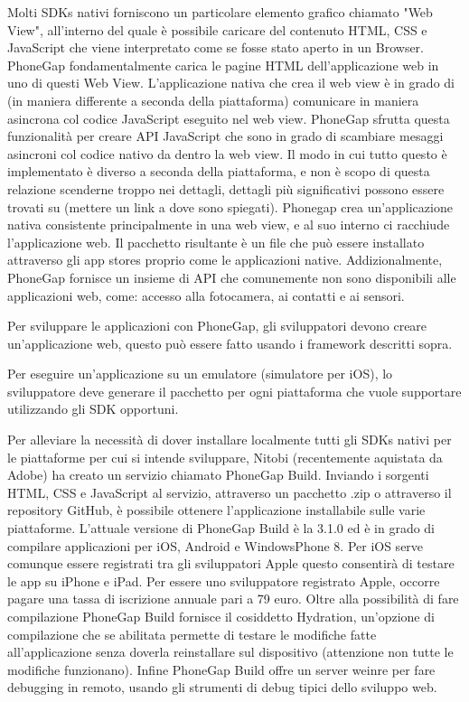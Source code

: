 			Molti SDKs nativi forniscono un particolare elemento grafico chiamato 
			"Web View", all'interno del quale è possibile caricare del contenuto 
			HTML, CSS e JavaScript che viene interpretato come se fosse stato aperto in 
			un Browser. 
			PhoneGap fondamentalmente carica le pagine HTML dell'applicazione web 
			in uno di questi Web View. L'applicazione nativa che crea il web view 
			è in grado di (in maniera differente a seconda della piattaforma) 
			comunicare in maniera asincrona col codice JavaScript eseguito nel 
			web view. 
			PhoneGap sfrutta questa funzionalità per creare API JavaScript 
			che sono in grado di scambiare mesaggi asincroni col codice 
			nativo da dentro la web view.  
			Il modo in cui tutto questo è implementato è diverso a seconda della 
			piattaforma, e non è scopo di questa relazione scenderne troppo nei 
			dettagli, dettagli più significativi possono essere trovati su 
			(mettere un link a dove sono spiegati).
			Phonegap crea un'applicazione nativa consistente principalmente in 
			una web view, e al suo interno ci racchiude l'applicazione web. Il pacchetto 
			risultante è un file che può essere installato attraverso gli app stores
			proprio come le applicazioni native.
			Addizionalmente, PhoneGap fornisce un insieme di API che comunemente non 
			sono disponibili alle applicazioni web, come: accesso alla fotocamera, 
			ai contatti e ai sensori.
			
			Per sviluppare le applicazioni con PhoneGap, gli sviluppatori devono 
			creare un'applicazione web, questo può essere fatto usando i framework 
			descritti sopra.  
			
			Per eseguire un'applicazione su un emulatore (simulatore per iOS), 
			lo sviluppatore deve generare il pacchetto per ogni piattaforma che 
			vuole supportare utilizzando gli SDK opportuni.
			
			Per alleviare la necessità di dover installare localmente 
			tutti gli SDKs nativi 
			per le piattaforme per cui si intende sviluppare, Nitobi (recentemente 
			aquistata da Adobe) ha creato un servizio chiamato PhoneGap Build. 
			Inviando i sorgenti HTML, CSS e JavaScript al servizio, attraverso un 
			pacchetto .zip o attraverso il repository GitHub, è possibile ottenere 
			l'applicazione installabile sulle varie piattaforme.
			L'attuale versione di PhoneGap Build è la 3.1.0 ed è in grado di compilare 
			applicazioni per iOS, Android e WindowsPhone 8. Per iOS serve comunque 
			essere registrati tra gli sviluppatori Apple questo consentirà di 
			testare le app su iPhone e iPad. Per essere uno sviluppatore 
			registrato Apple, occorre pagare una tassa di iscrizione annuale 
			pari a 79 euro.
			Oltre alla possibilità di fare compilazione PhoneGap Build fornisce 
			il cosiddetto Hydration, un'opzione di compilazione che se abilitata 
			permette di testare le modifiche fatte all'applicazione senza doverla 
			reinstallare sul dispositivo (attenzione non tutte le modifiche 
			funzionano). Infine PhoneGap Build offre un server weinre per fare 
			debugging in remoto, usando gli strumenti di debug tipici dello 
			sviluppo web.
			 
